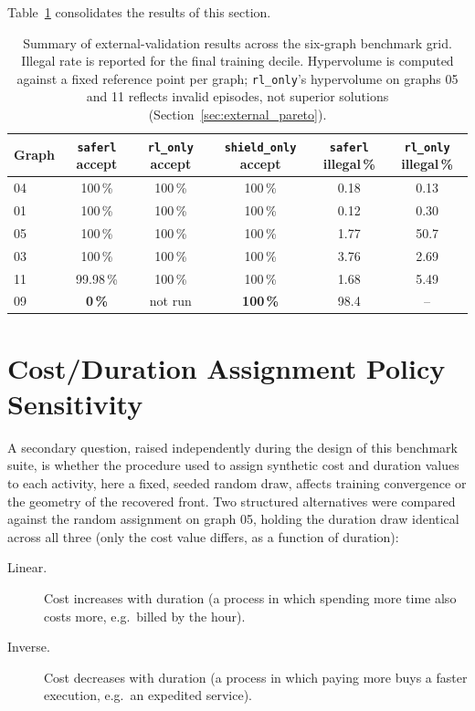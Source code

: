 Table~\ref{tab:external_master} consolidates the results of this
section.

\begin{table}[H]
\centering
\caption{Summary of external-validation results across the six-graph
benchmark grid. Illegal rate is reported for the final training decile.
Hypervolume is computed against a fixed reference point per graph;
\texttt{rl\_only}'s hypervolume on graphs 05 and 11 reflects invalid
episodes, not superior solutions (Section~\ref{sec:external_pareto}).}
\label{tab:external_master}
\begin{tabular}{lccccc}
\toprule
\textbf{Graph} & \textbf{\texttt{saferl} accept} & \textbf{\texttt{rl\_only} accept}
& \textbf{\texttt{shield\_only} accept} & \textbf{\texttt{saferl} illegal\,\%}
& \textbf{\texttt{rl\_only} illegal\,\%} \\
\midrule
04 & 100\,\%   & 100\,\% & 100\,\% & 0.18 & 0.13 \\
01 & 100\,\%   & 100\,\% & 100\,\% & 0.12 & 0.30 \\
05 & 100\,\%   & 100\,\% & 100\,\% & 1.77 & 50.7 \\
03 & 100\,\%   & 100\,\% & 100\,\% & 3.76 & 2.69 \\
11 & 99.98\,\% & 100\,\% & 100\,\% & 1.68 & 5.49 \\
09 & \textbf{0\,\%} & not run & \textbf{100\,\%} & 98.4 & -- \\
\bottomrule
\end{tabular}
\end{table}

\section{Cost/Duration Assignment Policy Sensitivity}
\label{sec:external_policy}

A secondary question, raised independently during the design of this
benchmark suite, is whether the procedure used to assign synthetic
cost and duration values to each activity, here a fixed, seeded
random draw, affects training convergence or the geometry of the
recovered front. Two structured alternatives were compared against the
random assignment on graph 05, holding the duration draw identical
across all three (only the cost value differs, as a function of
duration):

\begin{description}
    \item[Linear.] Cost increases with duration (a process in which
    spending more time also costs more, e.g.\ billed by the hour).
    \item[Inverse.] Cost decreases with duration (a process in which
    paying more buys a faster execution, e.g.\ an expedited service).
\end{description}

